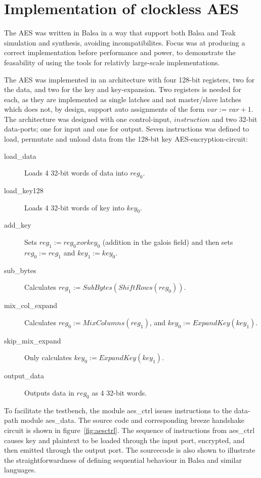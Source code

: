 \section{Implementation of clockless AES}

The AES was written in Balsa in a way that support both Balsa and
Teak simulation and synthesis, avoiding incompatibilites. Focus was at
producing a correct implementation before performance and power, to
demonstrate the feasability of using the tools for relativly
large-scale implementations.

The AES was implemented in an architecture with four 128-bit
registers, two for the data, and two for the key and
key-expansion. Two registers is needed for each, as they are
implemented as single latches and not master/slave latches which does
not, by design, support auto assignments of the form 
$var := var + 1$. The architecture was designed with one control-input,
$instruction$ and two 32-bit data-ports; one for input and one for
output. Seven instructions was defined to load, permutate and unload
data from the 128-bit key AES-encryption-circuit:

\begin{description}
  \item[load\_data] Loads 4 32-bit words of data into $reg_0$.
  \item[load\_key128] Loads 4 32-bit words of key into $key_0$.
  \item[add\_key] Sets $reg_1 := reg_0 xor key_0$ (addition in the
    galois field) and then sets $reg_0 := reg_1$ and $key_1 := key_0$.
  \item[sub\_bytes] Calculates $reg_1 := SubBytes(ShiftRows(reg_0))$.
  \item[mix\_col\_expand] Calculates $reg_0 := MixColumns(reg_1)$, and
    $key_0 := ExpandKey(key_1)$.
  \item[skip\_mix\_expand] Only calculates $key_0 := ExpandKey(key_1)$.
  \item[output\_data] Outputs data in $reg_0$ as 4 32-bit words.
\end{description}

To facilitate the testbench, the module aes\_ctrl issues instructions
to the data-path module aes\_data. The source code and corresponding
breeze handshake circuit is shown in figure~\ref{fig:aesctrl}. The
sequence of instructions from aes\_ctrl causes key and plaintext to be
loaded through the input port, encrypted, and then emitted through the
output port. The sourcecode is also shown to illustrate the
straightforwardness of defining sequential behaviour in Balsa and
similar languages.

